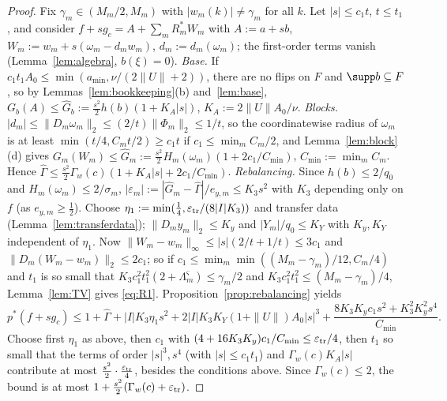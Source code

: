 \begin{proof}
Fix $\gamma_m\in(M_m/2,M_m)$ with $|w_m(k)|\ne\gamma_m$ for all $k$.  Let
$|s|\le c_1t$, $t\le t_1$, and consider $f+sg_c=A+\sum_mR^*_mW_m$ with
$A:=a+sb$, $W_m:=w_m+s(\omega_m-d_mw_m)$, $d_m:=d_m(\omega_m)$; the
first-order terms vanish (Lemma~\ref{lem:algebra}, $b(\xi)=0$).
\emph{Base.}  If $c_1t_1A_0\le\min(a_{\min},\nu/(2\|U\|+2))$, there are no
flips on $F$ and $\supp b\subseteq F$, so by
Lemmas~\ref{lem:bookkeeping}(b) and~\ref{lem:base},
$G_b(A)\le\hat G_b:=\frac{s^2}2h(b)(1+K_A|s|)$, $K_A:=2\|U\|A_0/\nu$.
\emph{Blocks.}  $|d_m|\le\|D_m\omega_m\|_2\le(2/t)\|\Phi_m\|_2\le1/t$, so the
coordinatewise radius of $\omega_m$ is at least $\min(t/4,C_mt/2)\ge c_1t$
if $c_1\le\min_mC_m/2$, and Lemma~\ref{lem:block}(d) gives $G_m(W_m)\le\hat
G_m:=\frac{s^2}2H_m(\omega_m)(1+2c_1/C_{\min})$, $C_{\min}:=\min_mC_m$.
Hence $\hat\Gamma\le\frac{s^2}2\Gamma_w(c)(1+K_A|s|+2c_1/C_{\min})$.
\emph{Rebalancing.}  Since $h(b)\le2/q_0$ and $H_m(\omega_m)\le2/\sigma_m$,
$|\varepsilon_m|:=|\hat G_m-\hat\Gamma|/e_{y,m}\le K_3s^2$ with $K_3$
depending only on $f$ (as $e_{y,m}\ge\frac12$).  Choose
$\eta_1:=\min(\frac14,\varepsilon_{\rm tr}/(8|I|K_3))$ and transfer data
(Lemma~\ref{lem:transferdata}); $\|D_my_m\|_2\le K_y$ and $|Y_m|/q_0\le K_Y$
with $K_y,K_Y$ independent of $\eta_1$.  Now $\|W_m-w_m\|_\infty\le
|s|(2/t+1/t)\le3c_1$ and $\|D_m(W_m-w_m)\|_2\le2c_1$; so if $c_1\le
\min_m\min((M_m-\gamma_m)/12,C_m/4)$ and $t_1$ is so small that $K_3c_1^2t_1^2
(2+\Lambda^\varsigma_m)\le\gamma_m/2$ and $K_3c_1^2t_1^2\le(M_m-\gamma_m)/4$,
Lemma~\ref{lem:TV} gives \eqref{eq:R1}.  Proposition~\ref{prop:rebalancing}
yields
\[
 p^*(f+sg_c)\le1+\hat\Gamma+|I|K_3\eta_1s^2+2|I|K_3K_Y(1+\|U\|)A_0|s|^3+
 \frac{8K_3K_yc_1s^2+K_3^2K_y^2s^4}{C_{\min}} .
\]
Choose first $\eta_1$ as above, then $c_1$ with
$(4+16K_3K_y)c_1/C_{\min}\le\varepsilon_{\rm tr}/4$, then $t_1$ so small that
the terms of order $|s|^3,s^4$ (with $|s|\le c_1t_1$) and $\Gamma_w(c)K_A|s|$
contribute at most $\frac{s^2}2\cdot\frac{\varepsilon_{\rm tr}}4$, besides the
conditions above.  Since $\Gamma_w(c)\le2$, the bound is at most
$1+\frac{s^2}2(\Gamma_w(c)+\varepsilon_{\rm tr})$.
\end{proof}

